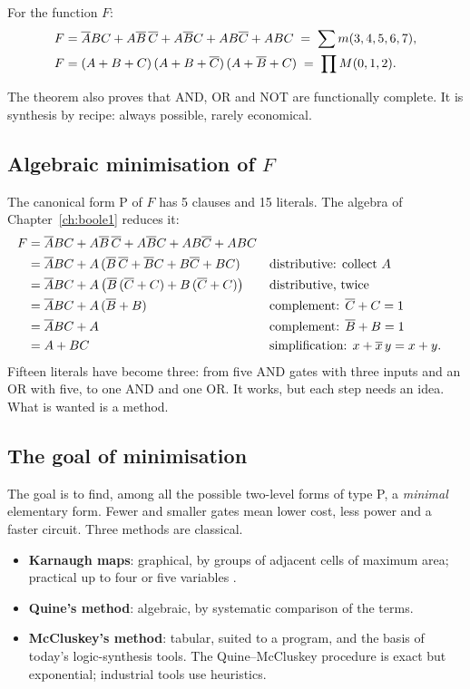 \smallskip
For the function $F$:
\begin{align*}
F &= \overline{A}BC+A\overline{B}\,\overline{C}+A\overline{B}C+AB\overline{C}+ABC \;=\; \sum m(3,4,5,6,7),\\
F &= (A+B+C)\,(A+B+\overline{C})\,(A+\overline{B}+C) \;=\; \prod M(0,1,2).
\end{align*}

The theorem also proves that AND, OR and NOT are functionally complete. It is
synthesis by recipe: always possible, rarely economical.

\subsection{Algebraic minimisation of $F$}

The canonical form P of $F$ has 5 clauses and 15 literals. The algebra of
Chapter~\ref{ch:boole1} reduces it:
\begin{align*}
F &= \overline{A}BC+A\overline{B}\,\overline{C}+A\overline{B}C+AB\overline{C}+ABC\\
 &= \overline{A}BC+A\,(\overline{B}\,\overline{C}+\overline{B}C+B\overline{C}+BC) && \text{distributive: collect $A$}\\
 &= \overline{A}BC+A\,\bigl(\overline{B}\,(\overline{C}+C)+B\,(\overline{C}+C)\bigr) && \text{distributive, twice}\\
 &= \overline{A}BC+A\,(\overline{B}+B) && \text{complement: $\overline{C}+C=1$}\\
 &= \overline{A}BC+A && \text{complement: $\overline{B}+B=1$}\\
 &= A+BC && \text{simplification: $x+\overline{x}\,y=x+y$.}
\end{align*}
Fifteen literals have become three: from five AND gates with three inputs and
an OR with five, to one AND and one OR. It works, but each step needs an
idea. What is wanted is a method.

\subsection{The goal of minimisation}

The goal is to find, among all the possible two-level forms of type P, a
\emph{minimal} elementary form. Fewer and smaller gates mean lower cost, less
power and a faster circuit. Three methods are classical.

\begin{itemize}
\item \textbf{Karnaugh maps}: graphical, by groups of adjacent cells of maximum
  area; practical up to four or five variables \citep{karnaugh1953}.
\item \textbf{Quine's method}: algebraic, by systematic comparison of the terms.
\item \textbf{McCluskey's method}: tabular, suited to a program, and the basis
  of today's logic-synthesis tools. The Quine--McCluskey procedure is exact
  but exponential; industrial tools use heuristics.
\end{itemize}

